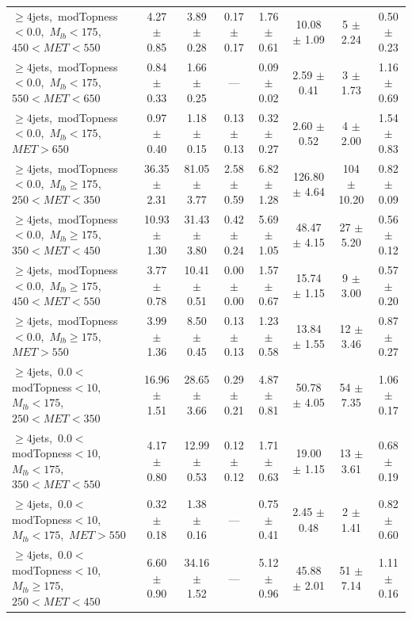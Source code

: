 \begin{table}
\begin{tabular}{|l|c c c c c|c|c|}
$\ge4$jets,~modTopness$<0.0$,~$M_{lb}<175$,~$450<MET<550$       & 4.27 $\pm$ 0.85  & 3.89 $\pm$ 0.28   & 0.17 $\pm$ 0.17 & 1.76 $\pm$ 0.61  & 10.08 $\pm$ 1.09  & 5 $\pm$ 2.24    & 0.50 $\pm$ 0.23 \\
$\ge4$jets,~modTopness$<0.0$,~$M_{lb}<175$,~$550<MET<650$       & 0.84 $\pm$ 0.33  & 1.66 $\pm$ 0.25   &       ---       & 0.09 $\pm$ 0.02  & 2.59 $\pm$ 0.41   & 3 $\pm$ 1.73    & 1.16 $\pm$ 0.69 \\
$\ge4$jets,~modTopness$<0.0$,~$M_{lb}<175$,~$MET>650$           & 0.97 $\pm$ 0.40  & 1.18 $\pm$ 0.15   & 0.13 $\pm$ 0.13 & 0.32 $\pm$ 0.27  & 2.60 $\pm$ 0.52   & 4 $\pm$ 2.00    & 1.54 $\pm$ 0.83 \\
\hline
$\ge4$jets,~modTopness$<0.0$,~$M_{lb}\ge175$,~$250<MET<350$     & 36.35 $\pm$ 2.31 & 81.05 $\pm$ 3.77  & 2.58 $\pm$ 0.59 & 6.82 $\pm$ 1.28  & 126.80 $\pm$ 4.64 & 104 $\pm$ 10.20 & 0.82 $\pm$ 0.09 \\
$\ge4$jets,~modTopness$<0.0$,~$M_{lb}\ge175$,~$350<MET<450$     & 10.93 $\pm$ 1.30 & 31.43 $\pm$ 3.80  & 0.42 $\pm$ 0.24 & 5.69 $\pm$ 1.05  & 48.47 $\pm$ 4.15  & 27 $\pm$ 5.20   & 0.56 $\pm$ 0.12 \\
$\ge4$jets,~modTopness$<0.0$,~$M_{lb}\ge175$,~$450<MET<550$     & 3.77 $\pm$ 0.78  & 10.41 $\pm$ 0.51  & 0.00 $\pm$ 0.00 & 1.57 $\pm$ 0.67  & 15.74 $\pm$ 1.15  & 9 $\pm$ 3.00    & 0.57 $\pm$ 0.20 \\
$\ge4$jets,~modTopness$<0.0$,~$M_{lb}\ge175$,~$MET>550$         & 3.99 $\pm$ 1.36  & 8.50 $\pm$ 0.45   & 0.13 $\pm$ 0.13 & 1.23 $\pm$ 0.58  & 13.84 $\pm$ 1.55  & 12 $\pm$ 3.46   & 0.87 $\pm$ 0.27 \\
\hline
$\ge4$jets,~$0.0<$modTopness$<10$,~$M_{lb}<175$,~$250<MET<350$  & 16.96 $\pm$ 1.51 & 28.65 $\pm$ 3.66  & 0.29 $\pm$ 0.21 & 4.87 $\pm$ 0.81  & 50.78 $\pm$ 4.05  & 54 $\pm$ 7.35   & 1.06 $\pm$ 0.17 \\
$\ge4$jets,~$0.0<$modTopness$<10$,~$M_{lb}<175$,~$350<MET<550$  & 4.17 $\pm$ 0.80  & 12.99 $\pm$ 0.53  & 0.12 $\pm$ 0.12 & 1.71 $\pm$ 0.63  & 19.00 $\pm$ 1.15  & 13 $\pm$ 3.61   & 0.68 $\pm$ 0.19 \\
$\ge4$jets,~$0.0<$modTopness$<10$,~$M_{lb}<175$,~$MET>550$      & 0.32 $\pm$ 0.18  & 1.38 $\pm$ 0.16   &       ---       & 0.75 $\pm$ 0.41  & 2.45 $\pm$ 0.48   & 2 $\pm$ 1.41    & 0.82 $\pm$ 0.60 \\
\hline
$\ge4$jets,~$0.0<$modTopness$<10$,~$M_{lb}\ge175$,~$250<MET<450$& 6.60 $\pm$ 0.90  & 34.16 $\pm$ 1.52  &       ---       & 5.12 $\pm$ 0.96  & 45.88 $\pm$ 2.01  & 51 $\pm$ 7.14   & 1.11 $\pm$ 0.16 \\

\end{tabular}
\end{table}
